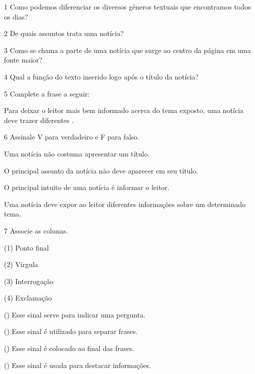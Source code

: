 
\num{1} Como podemos diferenciar os diversos gêneros textuais que
encontramos todos os dias?



\num{2} De quais assuntos trata uma notícia?



\num{3} Como se chama a parte de uma notícia que surge ao centro da página
em uma fonte maior?



\num{4} Qual a função do texto inserido logo após o título da notícia?


\num{5} Complete a frase a seguir:

Para deixar o leitor mais bem informado acerca do tema exposto, uma
notícia deve trazer diferentes \preencher\preencher\preencher.


\num{6} Assinale V para verdadeiro e F para falso.

\begin{boxlist}
\item Uma notícia não costuma apresentar um título. 

\item O principal assunto da notícia não deve aparecer em seu título. 

\item O principal intuito de uma notícia é informar o leitor. 

\item Uma notícia deve expor ao leitor diferentes informações sobre um 
determinado tema.
\end{boxlist}

\num{7} Associe as colunas.

\begin{multicols}{2}
(1) Ponto final\medskip

(2) Vírgula\medskip

(3) Interrogação\medskip

(4) Exclamação

\columnbreak

() Esse sinal serve para indicar uma pergunta. 

() Esse sinal é utilizado para separar frases. 

() Esse sinal é colocado ao final das frases. 

() Esse sinal é usada para destacar informações. 
\end{multicols}

